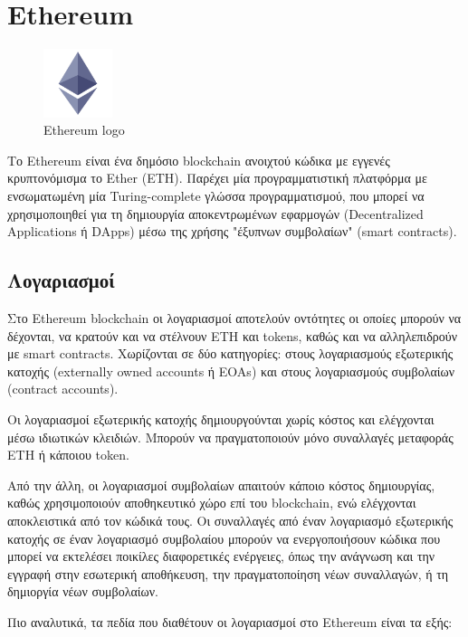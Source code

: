 \section{Ethereum}

\begin{figure}[H]
	\centering
	\includegraphics[width=2cm]{assets/figures/ethereum-logo.png}
	\caption{Ethereum logo}
\end{figure}

Το Ethereum είναι ένα δημόσιο blockchain ανοιχτού κώδικα με εγγενές κρυπτονόμισμα το Ether (ETH). Παρέχει μία προγραμματιστική πλατφόρμα με ενσωματωμένη μία Turing-complete γλώσσα προγραμματισμού, που μπορεί να χρησιμοποιηθεί για τη δημιουργία αποκεντρωμένων εφαρμογών (Decentralized Applications ή DApps) μέσω της χρήσης "έξυπνων συμβολαίων" (smart contracts)\cite{2.6-ethereum-whitepaper}.

\subsection{Λογαριασμοί}
Στο Ethereum blockchain οι λογαριασμοί αποτελούν οντότητες οι οποίες μπορούν να δέχονται, να κρατούν και να στέλνουν ETH και tokens, καθώς και να αλληλεπιδρούν με smart contracts\cite{2.6-ethereum-documentation}. Χωρίζονται σε δύο κατηγορίες: στους λογαριασμούς εξωτερικής κατοχής (externally owned accounts ή EOAs) και στους λογαριασμούς συμβολαίων (contract accounts).

Οι λογαριασμοί εξωτερικής κατοχής δημιουργούνται χωρίς κόστος και ελέγχονται μέσω ιδιωτικών κλειδιών. Μπορούν να πραγματοποιούν μόνο συναλλαγές μεταφοράς ETH ή κάποιου token.

Από την άλλη, οι λογαριασμοί συμβολαίων απαιτούν κάποιο κόστος δημιουργίας, καθώς χρησιμοποιούν αποθηκευτικό χώρο επί του blockchain, ενώ ελέγχονται αποκλειστικά από τον κώδικά τους. Οι συναλλαγές από έναν λογαριασμό εξωτερικής κατοχής σε έναν λογαριασμό συμβολαίου μπορούν να ενεργοποιήσουν κώδικα που μπορεί να εκτελέσει ποικίλες διαφορετικές ενέργειες, όπως την ανάγνωση και την εγγραφή στην εσωτερική αποθήκευση, την πραγματοποίηση νέων συναλλαγών, ή τη δημιοργία νέων συμβολαίων.

Πιο αναλυτικά, τα πεδία που διαθέτουν οι λογαριασμοί στο Ethereum είναι τα εξής:

